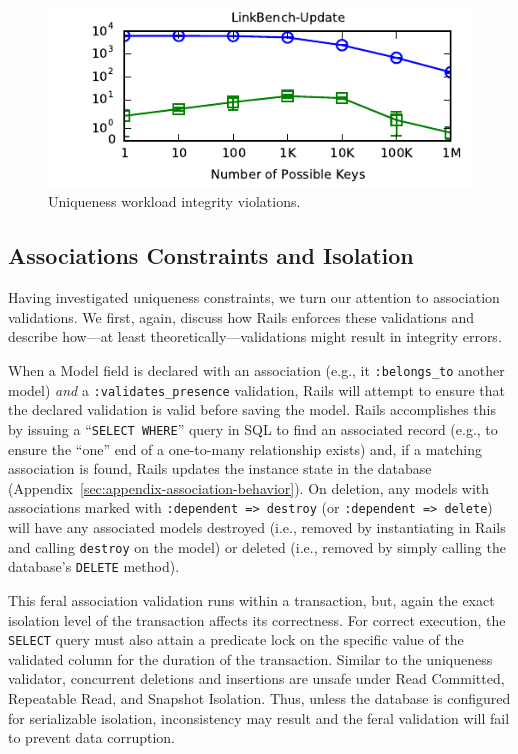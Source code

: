 \begin{figure}
\begin{minipage}{\columnwidth}
\includegraphics[width=1\columnwidth]{figs/pk-workload-linkbench-upd-violations.pdf}\vspace{-1em}
\end{minipage}
\caption{Uniqueness workload integrity violations.}
\label{fig:pk-workload}
\end{figure}


\subsection{Associations Constraints and Isolation}

Having investigated uniqueness constraints, we turn our attention to
association validations. We first, again, discuss how Rails enforces
these validations and describe how---at least
theoretically---validations might result in integrity errors.

When a Model field is declared with an association (e.g., it
\texttt{:belongs\_to} another model) \textit{and} a
\texttt{:validates\_presence} validation, Rails will attempt to ensure
that the declared validation is valid before saving the model. Rails
accomplishes this by issuing a ``\texttt{SELECT WHERE}'' query in SQL
to find an associated record (e.g., to ensure the ``one'' end of a
one-to-many relationship exists) and, if a matching association is
found, Rails updates the instance state in the database
(Appendix~\ref{sec:appendix-association-behavior}). On deletion, any
models with associations marked with \texttt{:dependent => destroy}
(or \texttt{:dependent => delete}) will have any associated models
destroyed (i.e., removed by instantiating in Rails and calling
\texttt{destroy} on the model) or deleted (i.e., removed by simply
calling the database's \texttt{DELETE} method).

This feral association validation runs within a transaction, but,
again the exact isolation level of the transaction affects its
correctness. For correct execution, the \texttt{SELECT} query must
also attain a predicate lock on the specific value of the validated
column for the duration of the transaction. Similar to the uniqueness
validator, concurrent deletions and insertions are unsafe under Read
Committed, Repeatable Read, and Snapshot Isolation. Thus, unless the
database is configured for serializable isolation, inconsistency may
result and the feral validation will fail to prevent data corruption.

